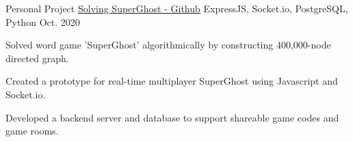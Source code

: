 \begin{cventries}
  \cventry
    {Personal Project} %
    {\href{https://github.com/danielq987/superghost-explorer}{Solving SuperGhost - \underline{Github}}} %
    {ExpressJS, Socket.io, PostgreSQL, Python} %
    {Oct. 2020} %
    {
      \begin{cvitems} %
        \item {Solved word game 'SuperGhost' algorithmically by constructing 400,000-node directed graph.}
        \item {Created a prototype for real-time multiplayer SuperGhost using Javascript and Socket.io.}
        \item {Developed a backend server and database to support shareable game codes and game rooms.}
      \end{cvitems}
    }


\end{cventries}
